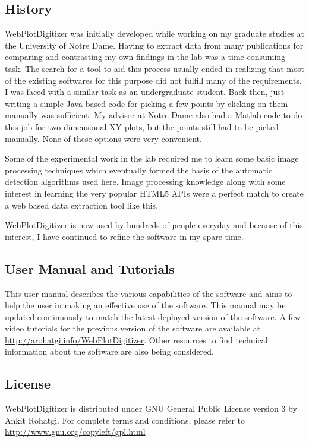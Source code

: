 \documentclass[letterpaper, 10pt]{article}
\begin{document}
\subsection{History}
WebPlotDigitizer was initially developed while working on my graduate studies at the University of Notre Dame. Having to extract data from many publications for comparing and contrasting my own findings in the lab was a time consuming task. The search for a tool to aid this process usually ended in realizing that most of the existing softwares for this purpose did not fulfill many of the requirements. I was faced with a similar task as an undergraduate student. Back then, just writing a simple Java based code for picking a few points by clicking on them manually was sufficient. My advisor at Notre Dame also had a Matlab code to do this job for two dimensional XY plots, but the points still had to be picked manually. None of these options were very convenient.

Some of the experimental work in the lab required me to learn some basic image processing techniques which eventually formed the basis of the automatic detection algorithms used here. Image processing knowledge along with some interest in learning the very popular HTML5 APIs were a perfect match to create a web based data extraction tool like this.

WebPlotDigitizer is now used by hundreds of people everyday and because of this interest, I have continued to refine the software in my spare time.

\subsection{User Manual and Tutorials}
This user manual describes the various capabilities of the software and aims to help the user in making an effective use of the software. This manual may be updated continuously to match the latest deployed version of the software. A few video tutorials for the previous version of the software are available at \url{http://arohatgi.info/WebPlotDigitizer}. Other resources to find technical information about the software are also being considered.

\subsection{License}
WebPlotDigitizer is distributed under GNU General Public License version 3 by Ankit Rohatgi. For complete terms and conditions, please refer to \url{http://www.gnu.org/copyleft/gpl.html}
\end{document}
